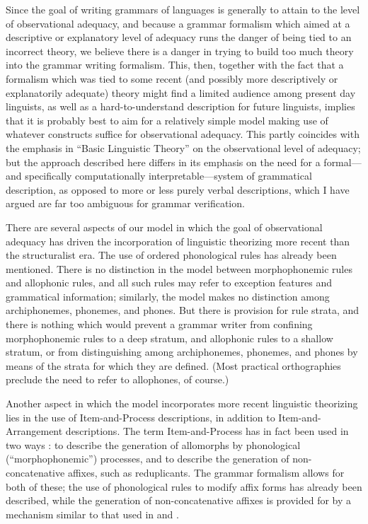 Since the goal of writing grammars of languages is generally to attain to the level of observational adequacy, and because a grammar formalism which aimed at a descriptive or explanatory level of adequacy runs the danger of being tied to an incorrect theory, we believe there is a danger in trying to build too much theory into the grammar writing formalism. This, then, together with the fact that a formalism which was tied to some recent (and possibly more descriptively or explanatorily adequate) theory might find a limited audience among present day linguists, as well as a hard-to-understand description for future linguists, implies that it is probably best to aim for a relatively simple model making use of whatever constructs suffice for observational adequacy. This partly coincides with the emphasis in ``Basic Linguistic Theory'' \citep{Dryer2006,Dixon2010} on the observational level of adequacy; but the approach described here differs in its emphasis on the need for a formal{}---and specifically computationally interpretable{}---system of grammatical description, as opposed to more or less purely verbal descriptions, which I have argued are far too ambiguous for grammar verification.

There are several aspects of our model in which the goal of observational adequacy has driven the incorporation of linguistic theorizing more recent than the structuralist era. The use of ordered phonological rules has already been mentioned. There is no distinction in the model between morphophonemic rules and allophonic rules, and all such rules may refer to exception features and grammatical information; similarly, the model makes no distinction among archiphonemes, phonemes, and phones. But there is provision for rule strata, and there is nothing which would prevent a grammar writer from confining morphophonemic rules to a deep stratum, and allophonic rules to a shallow stratum, or from distinguishing among archiphonemes, phonemes, and phones by means of the strata for which they are defined. (Most practical orthographies preclude the need to refer to allophones, of course.) 

Another aspect in which the model incorporates more recent linguistic theorizing lies in the use of Item-and-Process descriptions, in addition to Item-and-Arrangement descriptions. The term Item-and-Process has in fact been used in two ways \citep{Maxwell1996}: to describe the generation of allomorphs by phonological (``morphophonemic'') processes, and to describe the generation of non-concatenative affixes, such as reduplicants. The grammar formalism allows for both of these; the use of phonological rules to modify affix forms has already been described, while the generation of non-concatenative affixes is provided for by a mechanism similar to that used in \citet{MunroEtAl1973} and \citet{Carrier1979}.

